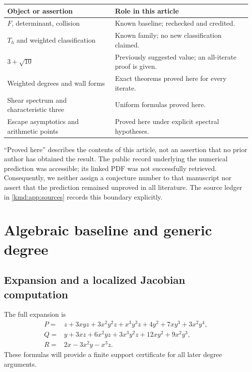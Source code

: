 \documentclass[11pt,a4paper]{article}
\numberwithin{equation}{section}
\theoremstyle{definition}
\theoremstyle{remark}
\begin{document}
\begin{center}
\small
\begin{tabular}{@{}p{}p{}@{}}
\toprule
Object or assertion & Role in this article\\
\midrule
$F$, determinant, collision & Known baseline; rechecked and credited.\\
$T_h$ and weighted classification & Known family; no new classification claimed.\\
$3+\sqrt{10}$ & Previously suggested value; an all-iterate proof is given.\\
Weighted degrees and wall forms & Exact theorems proved here for every iterate.\\
Shear spectrum and characteristic three & Uniform formulas proved here.\\
Escape asymptotics and arithmetic points & Proved here under explicit spectral hypotheses.\\
\bottomrule
\end{tabular}
\end{center}

``Proved here'' describes the contents of this article, not an assertion
that no prior author has obtained the result. The public record
underlying the numerical prediction was accessible; its linked PDF
was not successfully retrieved. Consequently, we neither assign a
conjecture number to that manuscript nor assert that the prediction
remained unproved in all literature. The source ledger in
\cref{kmd:app:sources} records this boundary explicitly.

\section{Algebraic baseline and generic degree}\label{kmd:sec:algebra}

\subsection{Expansion and a localized Jacobian computation}
The full expansion is
\begin{align}
 P={}&z+3xyz+3x^2y^2z+x^3y^3z+4y^2+7xy^3+3x^2y^4,
 \label{kmd:eq:P}\\
 Q={}&y+3xz+6x^2yz+3x^3y^2z+12xy^2+9x^2y^3,
 \label{kmd:eq:Q}\\
 R={}&2x-3x^2y-x^3z.\label{kmd:eq:R}
\end{align}
These formulas will provide a finite support certificate for all later
degree arguments.
\end{document}
